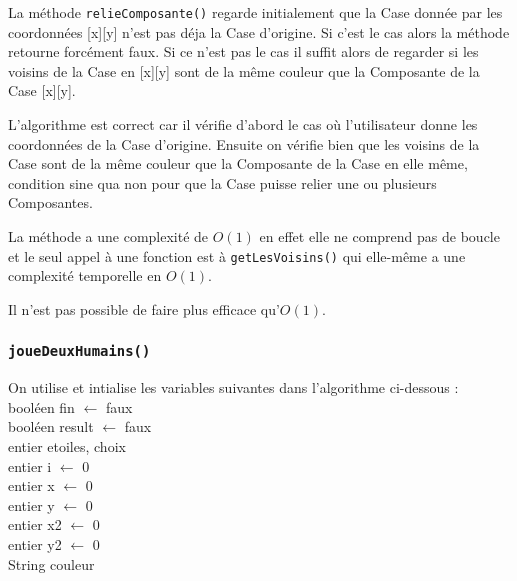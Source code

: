 \documentclass{article}
\newcommand{\info}{\texttt}
\begin{document}
                La méthode \info{relieComposante()} regarde initialement que la Case donnée par les coordonnées [x][y] n'est pas déja la Case d'origine. Si c'est le cas alors la méthode retourne forcément faux. Si ce n'est pas le cas il suffit alors de regarder si les voisins de la Case en [x][y] sont de la même couleur que la Composante de la Case [x][y].
                
                L'algorithme est correct car il vérifie d'abord le cas où l'utilisateur donne les coordonnées de la Case d'origine. Ensuite on vérifie bien que les voisins de la Case sont de la même couleur que la Composante de la Case en elle même, condition sine qua non pour que la Case puisse relier une ou plusieurs Composantes.
                
                La méthode a une complexité de $O(1)$ en effet elle ne comprend pas de boucle et le seul appel à une fonction est à \info{getLesVoisins()} qui elle-même a une complexité temporelle en $O(1)$.
                
                Il n'est pas possible de faire plus efficace qu'$O(1)$.
                
            \subsubsection{\info{joueDeuxHumains()}}
            
                On utilise et intialise les variables suivantes dans l'algorithme ci-dessous :\\
                booléen fin $\longleftarrow$ faux\\
                booléen result $\longleftarrow$ faux\\
                entier etoiles, choix\\
                entier i $\longleftarrow$ 0\\
                entier x $\longleftarrow$ 0\\
                entier y $\longleftarrow$ 0\\
                entier x2 $\longleftarrow$ 0\\
                entier y2 $\longleftarrow$ 0\\
                String couleur
                
\end{document}

